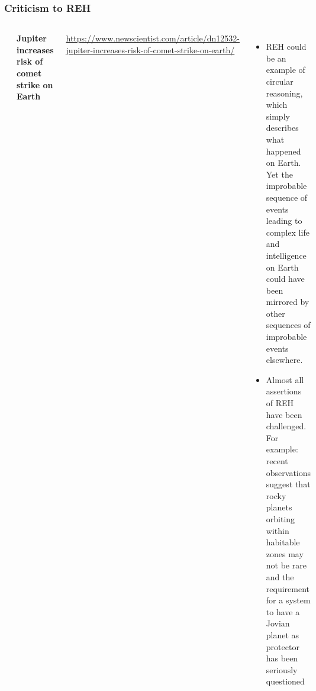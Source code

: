 \begin{frame}
\frametitle{Criticism to REH}

\begin{columns}

\includegraphics[scale=0.25]{jupyter}

{\bf Jupiter increases risk of comet strike on Earth}

\url{https://www.newscientist.com/article/dn12532-jupiter-increases-risk-of-comet-strike-on-earth/}

\begin{itemize}
\item
REH could be an example of circular reasoning, which simply describes what happened on Earth. Yet
the improbable sequence of events leading to complex life and intelligence on Earth could have been mirrored by other sequences of improbable events elsewhere.  

\item Almost all assertions of REH have been challenged. For example: recent observations suggest that rocky planets orbiting within habitable zones may not be rare and the requirement for a system to have a Jovian planet as protector has been seriously questioned %
\end{itemize}
\end{columns}
\end{frame}

